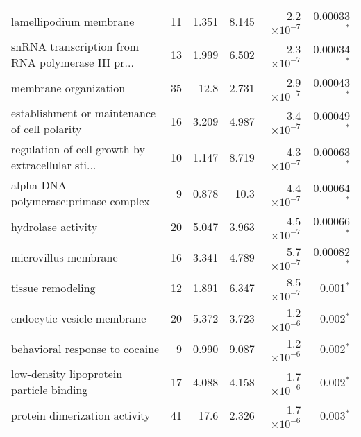 \begin{longtable}{|l|r|r|r|r|r|}
                            lamellipodium membrane &                      11 &                   1.351 &      8.145 &  2.2$\times 10^{-7}$ &               0.00033$\bm{^*}$ \\
 snRNA transcription from RNA polymerase III pr... &                      13 &                   1.999 &      6.502 &  2.3$\times 10^{-7}$ &               0.00034$\bm{^*}$ \\
                             membrane organization &                      35 &                    12.8 &      2.731 &  2.9$\times 10^{-7}$ &               0.00043$\bm{^*}$ \\
     establishment or maintenance of cell polarity &                      16 &                   3.209 &      4.987 &  3.4$\times 10^{-7}$ &               0.00049$\bm{^*}$ \\
 regulation of cell growth by extracellular sti... &                      10 &                   1.147 &      8.719 &  4.3$\times 10^{-7}$ &               0.00063$\bm{^*}$ \\
              alpha DNA polymerase:primase complex &                       9 &                   0.878 &       10.3 &  4.4$\times 10^{-7}$ &               0.00064$\bm{^*}$ \\
                                hydrolase activity &                      20 &                   5.047 &      3.963 &  4.5$\times 10^{-7}$ &               0.00066$\bm{^*}$ \\
                              microvillus membrane &                      16 &                   3.341 &      4.789 &  5.7$\times 10^{-7}$ &               0.00082$\bm{^*}$ \\
                                 tissue remodeling &                      12 &                   1.891 &      6.347 &  8.5$\times 10^{-7}$ &                 0.001$\bm{^*}$ \\
                        endocytic vesicle membrane &                      20 &                   5.372 &      3.723 &  1.2$\times 10^{-6}$ &                 0.002$\bm{^*}$ \\
                    behavioral response to cocaine &                       9 &                   0.990 &      9.087 &  1.2$\times 10^{-6}$ &                 0.002$\bm{^*}$ \\
          low-density lipoprotein particle binding &                      17 &                   4.088 &      4.158 &  1.7$\times 10^{-6}$ &                 0.002$\bm{^*}$ \\
                     protein dimerization activity &                      41 &                    17.6 &      2.326 &  1.7$\times 10^{-6}$ &                 0.003$\bm{^*}$ \\

\end{longtable}

